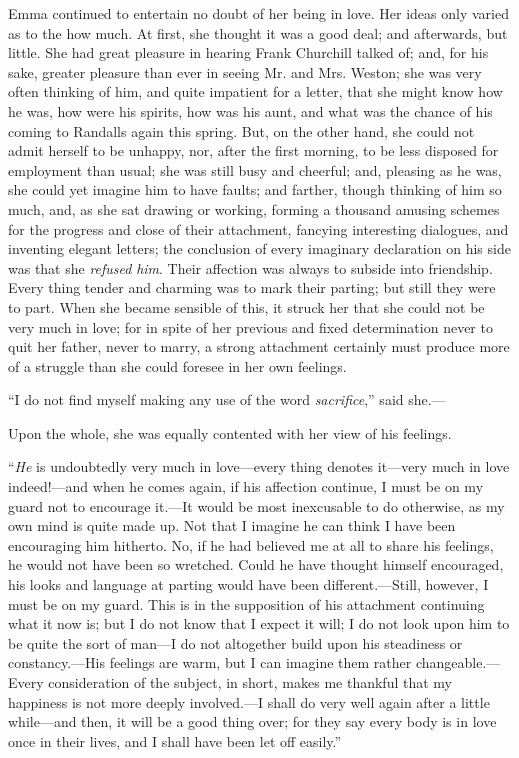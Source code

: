 Emma continued to entertain no doubt of her being in love. Her ideas only varied as to the how much. At first, she thought it was a good deal; and afterwards, but little. She had great pleasure in hearing Frank Churchill talked of; and, for his sake, greater pleasure than ever in seeing Mr. and Mrs. Weston; she was very often thinking of him, and quite impatient for a letter, that she might know how he was, how were his spirits, how was his aunt, and what was the chance of his coming to Randalls again this spring. But, on the other hand, she could not admit herself to be unhappy, nor, after the first morning, to be less disposed for employment than usual; she was still busy and cheerful; and, pleasing as he was, she could yet imagine him to have faults; and farther, though thinking of him so much, and, as she sat drawing or working, forming a thousand amusing schemes for the progress and close of their attachment, fancying interesting dialogues, and inventing elegant letters; the conclusion of every imaginary declaration on his side was that she {\em refused} {\em him}. Their affection was always to subside into friendship. Every thing tender and charming was to mark their parting; but still they were to part. When she became sensible of this, it struck her that she could not be very much in love; for in spite of her previous and fixed determination never to quit her father, never to marry, a strong attachment certainly must produce more of a struggle than she could foresee in her own feelings.

“I do not find myself making any use of the word {\em sacrifice},” said she.---

Upon the whole, she was equally contented with her view of his feelings.

“{\em He} is undoubtedly very much in love---every thing denotes it---very much in love indeed!---and when he comes again, if his affection continue, I must be on my guard not to encourage it.---It would be most inexcusable to do otherwise, as my own mind is quite made up. Not that I imagine he can think I have been encouraging him hitherto. No, if he had believed me at all to share his feelings, he would not have been so wretched. Could he have thought himself encouraged, his looks and language at parting would have been different.---Still, however, I must be on my guard. This is in the supposition of his attachment continuing what it now is; but I do not know that I expect it will; I do not look upon him to be quite the sort of man---I do not altogether build upon his steadiness or constancy.---His feelings are warm, but I can imagine them rather changeable.---Every consideration of the subject, in short, makes me thankful that my happiness is not more deeply involved.---I shall do very well again after a little while---and then, it will be a good thing over; for they say every body is in love once in their lives, and I shall have been let off easily.”

